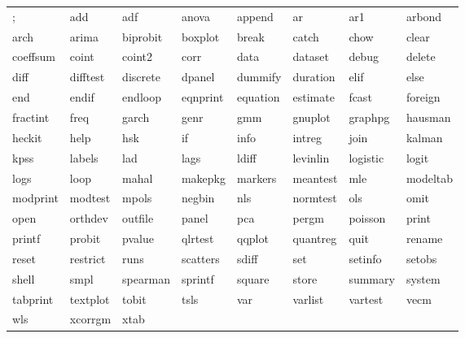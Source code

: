 \begin{tabular}{llllllll}
; & add & adf & anova & append & ar & ar1 & arbond \\
arch & arima & biprobit & boxplot & break & catch & chow & clear \\
coeffsum & coint & coint2 & corr & data & dataset & debug & delete \\
diff & difftest & discrete & dpanel & dummify & duration & elif & else \\
end & endif & endloop & eqnprint & equation & estimate & fcast & foreign \\
fractint & freq & garch & genr & gmm & gnuplot & graphpg & hausman \\
heckit & help & hsk & if & info & intreg & join & kalman \\
kpss & labels & lad & lags & ldiff & levinlin & logistic & logit \\
logs & loop & mahal & makepkg & markers & meantest & mle & modeltab \\
modprint & modtest & mpols & negbin & nls & normtest & ols & omit \\
open & orthdev & outfile & panel & pca & pergm & poisson & print \\
printf & probit & pvalue & qlrtest & qqplot & quantreg & quit & rename \\
reset & restrict & runs & scatters & sdiff & set & setinfo & setobs \\
shell & smpl & spearman & sprintf & square & store & summary & system \\
tabprint & textplot & tobit & tsls & var & varlist & vartest & vecm \\
wls & xcorrgm & xtab & \\
\end{tabular}

